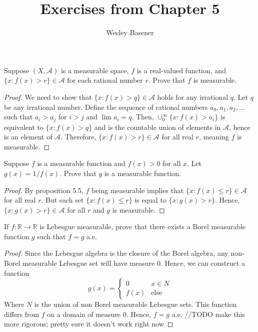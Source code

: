 \documentclass[10pt]{article}
\newcommand{\R}{\mathbb{R}}
\newenvironment{problem}[2][Problem]{\begin{trivlist}
		\item[\hskip \labelsep {\bfseries #1}\hskip \labelsep {\bfseries #2.}]}{\end{trivlist}}
\begin{document}
	
	\title{Exercises from Chapter 5}
	\author{Wesley Basener}
	\maketitle
	\begin{problem}{1}
		Suppose $(X, \mathcal{A})$ is a measurable space, $f$ is a real-valued function, and $\{x : f(x) > r\} \in \mathcal{A}$ for each rational number $r$. Prove that $f$ is measurable.
		\begin{proof}
			We need to show that $\{x : f(x) > q\} \in \mathcal{A}$ holds for any irrational $q$. Let $q$ be any irrational number. Define the sequence of rational numbers $a_0, a_1, a_2,...$ such that $a_i > a_j$ for $i > j$ and $\lim a_i = q$. Then, $\cup_0^\infty \{x : f(x) > a_i\}$ is equivalent to $\{x : f(x) > q\}$ and is the countable union of elements in $\mathcal{A}$, hence is an element of $\mathcal{A}$. Therefore, $\{x : f(x) > r\} \in \mathcal{A}$ for all real $r$, meaning $f$ is measurable.
		\end{proof}
	\end{problem}
	
	\begin{problem}{3}
		Suppose $f$ is a measurable function and $f(x) > 0$ for all $x$. Let $g(x) = 1/f(x)$. Prove that $g$ is a measurable function.
		\begin{proof}
			By proposition 5.5, $f$ being measurable implies that $\{x : f(x) \leq r\} \in \mathcal{A}$ for all real $r$. But each set $\{x : f(x) \leq r\}$ is equal to $\{x : g(x) > r\}$. Hence, $\{x : g(x) > r\} \in \mathcal{A}$ for all $r$ and $g$ is measurable.
		\end{proof}
	\end{problem}
	
	\begin{problem}{5}
		If $f : \R \rightarrow \R$ is Lebesgue measurable, prove that there exists a Borel measurable function $g$ such that $f = g$ a.e.
		\begin{proof}
			Since the Lebesgue algebra is the closure of the Borel algebra, any non-Borel measurable Lebesgue set will have measure $0$. Hence, we can construct a function 
			\[ g(x) = \begin{cases} 
				0 & x \in N\\
				f(x) & \text{else}
			\end{cases}
			\]
			Where $N$ is the union of non Borel measurable Lebesgue sets. This function differs from $f$ on a domain of measure $0$. Hence, $f=g$ a.e.
			//TODO make this more rigorous; pretty sure it doesn't work right now 
		\end{proof}
	\end{problem}
	
\end{document}
